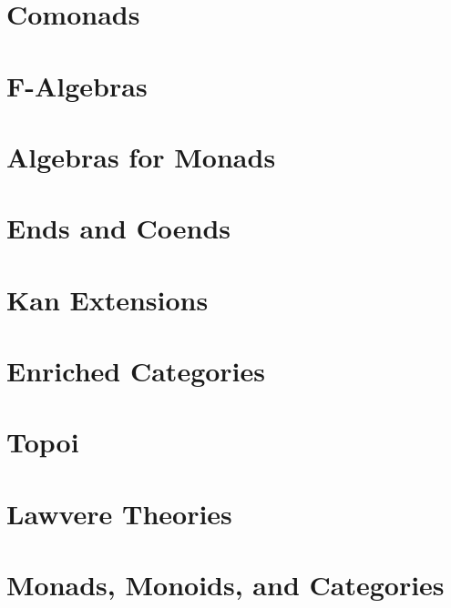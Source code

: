 \chapter{Comonads}\label{comonads}


\chapter{F-Algebras}\label{f-algebras}


\chapter{Algebras for Monads}\label{algebras-for-monads}


\chapter{Ends and Coends}\label{ends-and-coends}


\chapter{Kan Extensions}\label{kan-extensions}


\chapter{Enriched Categories}\label{enriched-categories}


\chapter{Topoi}\label{topoi}


\chapter{Lawvere Theories}\label{lawvere-theories}


\chapter{Monads, Monoids, and Categories}\label{monads-monoids-categories}


\backmatter

